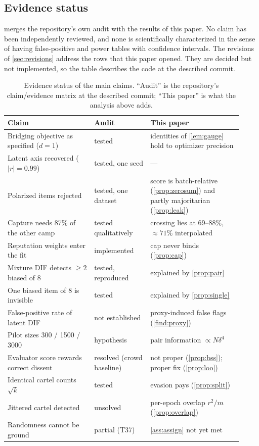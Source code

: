 \subsection{Evidence status}

 merges the repository's own audit with the results of this paper. No claim
has been independently reviewed, and none is scientifically characterized in the sense of having
false-positive and power tables with confidence intervals. The revisions of
\cref{sec:revisions} address the rows that this paper opened. They are decided but not
implemented, so the table describes the code at the described commit.

\begin{table}[t]
\centering\small
\caption{Evidence status of the main claims. ``Audit'' is the repository's claim/evidence matrix
at the described commit; ``This paper'' is what the analysis above adds.}
\label{tab:evidence}
\begin{tabular}{@{}>{\raggedright\arraybackslash}p{0.34\linewidth}>{\raggedright\arraybackslash}p{0.22\linewidth}>{\raggedright\arraybackslash}p{0.36\linewidth}@{}}
\toprule
Claim & Audit & This paper\\
\midrule
Bridging objective as specified ($d=1$) & tested & identities of \cref{lem:gauge} hold to optimizer precision\\
Latent axis recovered ($|r|=0.99$) & tested, one seed & ---\\
Polarized items rejected & tested, one dataset & score is batch-relative (\cref{prop:zerosum}) and partly majoritarian (\cref{prop:leak})\\
Capture needs 87\% of the other camp & tested qualitatively & crossing lies at 69--88\%, $\approx71\%$ interpolated\\
Reputation weights enter the fit & implemented & cap never binds (\cref{prop:cap})\\
Mixture DIF detects $\ge2$ biased of 8 & tested, reproduced & explained by \cref{prop:pair}\\
One biased item of 8 is invisible & tested & explained by \cref{prop:single}\\
False-positive rate of latent DIF & not established & proxy-induced false flags (\cref{find:proxy})\\
Pilot sizes 300 / 1500 / 3000 & hypothesis & pair information $\propto N\delta^4$\\
Evaluator score rewards correct dissent & resolved (crowd baseline) & not proper (\cref{prop:bss}); proper fix (\cref{prop:loo})\\
Identical cartel counts $\sqrt{k}$ & tested & evasion pays (\cref{prop:split})\\
Jittered cartel detected & unsolved & per-epoch overlap $r^2/m$ (\cref{prop:overlap})\\
Randomness cannot be ground & partial (T37) & \cref{ass:assign} not yet met\\
\bottomrule
\end{tabular}
\end{table}
